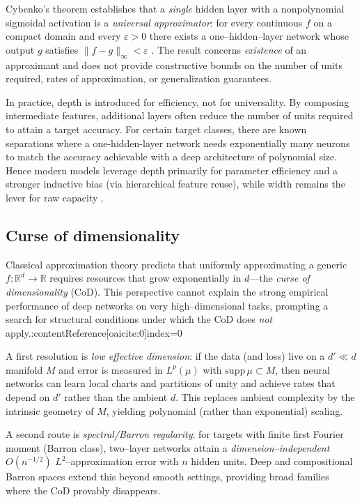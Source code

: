 Cybenko's theorem establishes that a \emph{single} hidden layer with a
nonpolynomial sigmoidal activation is a \emph{universal approximator}:
for every continuous $f$ on a compact domain and every $\varepsilon>0$
there exists a one–hidden–layer network whose output $g$ satisfies
$\|f-g\|_\infty<\varepsilon$ \cite{Cybenko1989}. The result concerns
\emph{existence} of an approximant and does not provide constructive
bounds on the number of units required, rates of approximation, or
generalization guarantees.

In practice, depth is introduced for efficiency, not for universality. By composing intermediate features, additional layers often reduce the number of units required to attain a target accuracy. For certain target classes, there are known separations where a one-hidden-layer network needs exponentially many neurons to match the accuracy achievable with a deep architecture of polynomial size. Hence modern models leverage depth primarily for parameter efficiency and a stronger inductive bias (via hierarchical feature reuse), while width remains the lever for raw capacity \cite{Berner_2022}.
\subsection{Curse of dimensionality}

Classical approximation theory predicts that uniformly approximating a generic
$f:\mathbb{R}^d\!\to\!\mathbb{R}$ requires resources that grow exponentially in $d$—the
\emph{curse of dimensionality} (CoD). This perspective cannot explain the strong
empirical performance of deep networks on very high–dimensional tasks, prompting
a search for structural conditions under which the CoD does \emph{not} apply.:contentReference[oaicite:0]{index=0}

A first resolution is \emph{low effective dimension}: if the data (and loss) live on a
$d'\!\ll\!d$ manifold $M$ and error is measured in $L^p(\mu)$ with $\mathrm{supp}\,\mu\subset M$,
then neural networks can learn local charts and partitions of unity and achieve rates
that depend on $d'$ rather than the ambient $d$. This replaces ambient complexity
by the intrinsic geometry of $M$, yielding polynomial (rather than exponential)
scaling.

A second route is \emph{spectral/Barron regularity}: for targets with finite first Fourier
moment (Barron class), two–layer networks attain a \emph{dimension–independent}
$O(n^{-1/2})$ $L^2$–approximation error with $n$ hidden units. Deep and
compositional Barron spaces extend this beyond smooth settings, providing broad
families where the CoD provably disappears.

